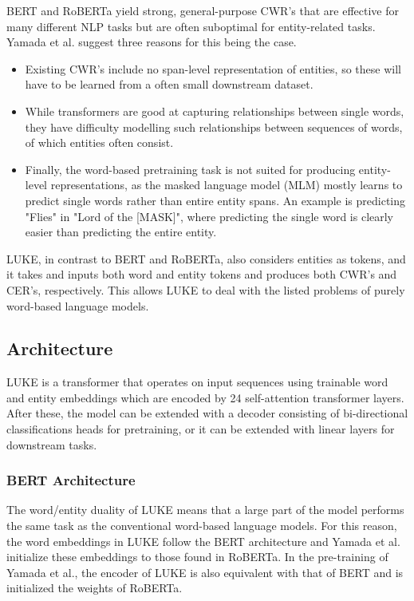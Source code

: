 \documentclass[main.tex]{subfiles}
\begin{document}
BERT \cite{devlin2019bert} and RoBERTa \cite{liu2019roberta} yield strong, general-purpose CWR's that are effective for many different NLP tasks but are often suboptimal for entity-related tasks.
Yamada et al. suggest three reasons for this being the case.
\begin{itemize}
    \item Existing CWR's include no span-level representation of entities, so these will have to be learned from a often small downstream dataset.
    \item While transformers are good at capturing relationships between single words, they have difficulty modelling such relationships between sequences of words, of which entities often consist.
    \item Finally, the word-based pretraining task is not suited for producing entity-level representations, as the masked language model (MLM) mostly learns to predict single words rather than entire entity spans.
    An example is predicting "Flies" in "Lord of the [MASK]", where predicting the single word is clearly easier than predicting the entire entity.
\end{itemize}
LUKE, in contrast to BERT and RoBERTa, also considers entities as tokens, and it takes and inputs both word and entity tokens and produces both CWR's and CER's, respectively.
This allows LUKE to deal with the listed problems of purely word-based language models.

\subsection{Architecture}
LUKE is a transformer that operates on input sequences using trainable word and entity embeddings which are encoded by 24 self-attention transformer layers.
After these, the model can be extended with a decoder consisting of bi-directional classifications heads for pretraining, or it can be extended with linear layers for downstream tasks.

\subsubsection{BERT Architecture}
The word/entity duality of LUKE means that a large part of the model performs the same task as the conventional word-based language models.
For this reason, the word embeddings in LUKE follow the BERT architecture and Yamada et al. initialize these embeddings to those found in RoBERTa.
In the pre-training of Yamada et al., the encoder of LUKE is also equivalent with that of BERT and is initialized the weights of RoBERTa.
\end{document}
